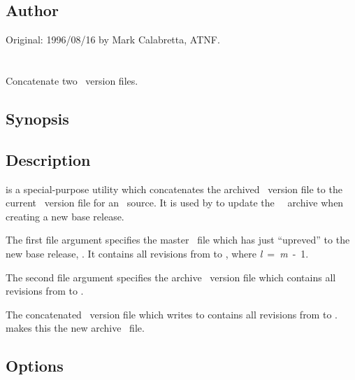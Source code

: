 \subsection*{Author}

Original: 1996/08/16 by Mark Calabretta, ATNF.

 
\newpage
\section{}
\label{rcscat}
 
Concatenate two \rcs\ version files.

\subsection*{Synopsis}
 
\begin{synopsis}
\end{synopsis}
 
\subsection*{Description}
 
 is a special-purpose utility which concatenates the archived
\rcs\ version file to the current \rcs\ version file for an \aipspp\ source.
It is used by  to update the \aipspp\ \rcs\ archive when
creating a new base release.

The first file argument specifies the master \rcs\ file which 
has just ``upreved'' to the new base release, .  It
contains all revisions from  to ,
where \textit{l}~=~\textit{m}~-~1.

The second file argument specifies the archive \rcs\ version file which
contains all revisions from  to .  

The concatenated \rcs\ version file which  writes to 
contains all revisions from  to .
 makes this the new archive \rcs\ file.
 
\subsection*{Options}
 

